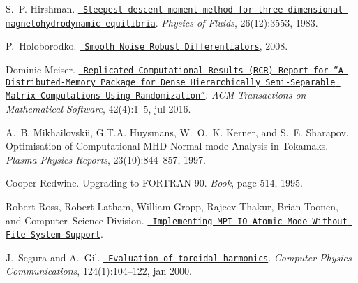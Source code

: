 \begin{DoxyDescription}
\item[\label{citelist_CITEREF_hirshman1983vmec}%
\Hypertarget{citelist_CITEREF_hirshman1983vmec}%
\mbox{[}8\mbox{]}]S.~P. Hirshman. \href{http://scitation.aip.org/content/aip/journal/pof1/26/12/10.1063/1.864116}{\texttt{ Steepest-\/descent moment method for three-\/dimensional magnetohydrodynamic equilibria}}. {\itshape Physics of Fluids}, 26(12)\+:3553, 1983. 


\item[\label{citelist_CITEREF_holoborodko2008diff}%
\Hypertarget{citelist_CITEREF_holoborodko2008diff}%
\mbox{[}9\mbox{]}]P.~Holoborodko. \href{http://www.holoborodko.com/pavel/numerical-methods/numerical-derivative/smooth-low-noise-differentiators/}{\texttt{ Smooth Noise Robust Differentiators}}, 2008.


\item[\label{citelist_CITEREF_Meiser2016}%
\Hypertarget{citelist_CITEREF_Meiser2016}%
\mbox{[}10\mbox{]}]Dominic Meiser. \href{http://dl.acm.org/citation.cfm?doid=2956571.2929907}{\texttt{ Replicated Computational Results (R\+CR) Report for “A Distributed-\/\+Memory Package for Dense Hierarchically Semi-\/\+Separable Matrix Computations Using Randomization”}}. {\itshape A\+CM Transactions on Mathematical Software}, 42(4)\+:1--5, jul 2016. 


\item[\label{citelist_CITEREF_mikhailovskii1997optimization}%
\Hypertarget{citelist_CITEREF_mikhailovskii1997optimization}%
\mbox{[}11\mbox{]}]A.~B. Mikhailovskii, G.\+T.\+A. Huysmans, W.~O.~K. Kerner, and S.~E. Sharapov. Optimisation of Computational M\+HD Normal-\/mode Analysis in Tokamaks. {\itshape Plasma Physics Reports}, 23(10)\+:844--857, 1997.


\item[\label{citelist_CITEREF_RedwineF90}%
\Hypertarget{citelist_CITEREF_RedwineF90}%
\mbox{[}12\mbox{]}]Cooper Redwine. Upgrading to F\+O\+R\+T\+R\+AN 90. {\itshape Book}, page 514, 1995. 


\item[\label{citelist_CITEREF_RossAtomicIO}%
\Hypertarget{citelist_CITEREF_RossAtomicIO}%
\mbox{[}13\mbox{]}]Robert Ross, Robert Latham, William Gropp, Rajeev Thakur, Brian Toonen, and Computer~Science Division. \href{http://www.mcs.anl.gov/~thakur/papers/atomic-mode.pdf}{\texttt{ Implementing M\+P\+I-\/\+IO Atomic Mode Without File System Support}}.


\item[\label{citelist_CITEREF_Segura2000}%
\Hypertarget{citelist_CITEREF_Segura2000}%
\mbox{[}14\mbox{]}]J.~Segura and A.~Gil. \href{http://linkinghub.elsevier.com/retrieve/pii/S0010465599004282
  https://ptp.jinr.ru/programs/cpc_ind8/ADKV.html
  http://cpc.cs.qub.ac.uk/summaries/ADKV_v1_0.html}{\texttt{ Evaluation of toroidal harmonics}}. {\itshape Computer Physics Communications}, 124(1)\+:104--122, jan 2000. 



\end{DoxyDescription}

